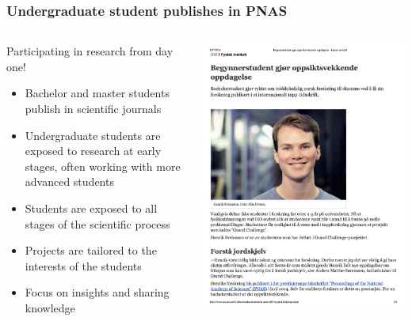 \documentclass{beamer}
\begin{document}
\begin{frame}
\frametitle{Undergraduate student publishes in PNAS}

\begin{columns}
\begin{block}{Participating in research from day one! }
\begin{itemize}
\item Bachelor and master students publish in scientific journals 

\item Undergraduate students are exposed to research at early stages, often working with more advanced students

\item Students are exposed to all stages of the scientific process

\item Projects are tailored to the interests of the students

\item Focus on insights and sharing knowledge
\end{itemize}

\noindent
\end{block}

\centerline{\includegraphics[width=1.0\linewidth]{fig-future/pnas.png}}



\end{columns}
\end{frame}
\end{document}

